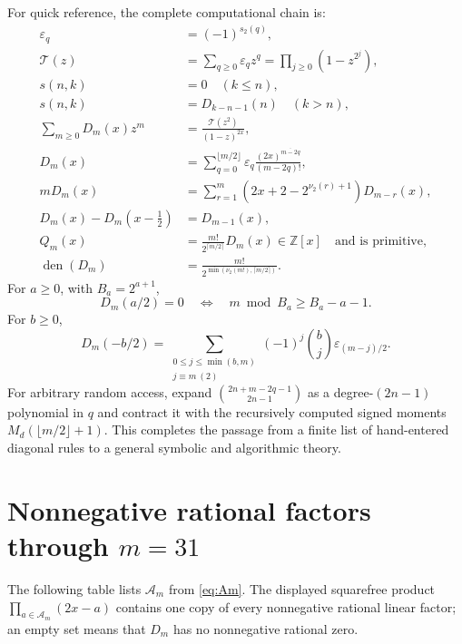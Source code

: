 \documentclass[11pt,oneside]{article}
\theoremstyle{definition}
\theoremstyle{remark}
\newcommand{\Z}{\mathbb Z}
\newcommand{\eps}{\varepsilon}
\newcommand{\Diag}{D}
\newcommand{\TM}{\mathcal T}
\newcommand{\vtwo}{\nu_{2}}
\newcommand{\bitsum}{s_{2}}
\newcommand{\rising}[2]{#1^{\overline{#2}}}
\begin{document}
For quick reference, the complete computational chain is:
\begin{align*}
 \eps_q&=(-1)^{\bitsum(q)},\\
 \TM(z)&=\sum_{q\ge0}\eps_qz^q
          =\prod_{j\ge0}(1-z^{2^j}),\\
 s(n,k)&=0\quad(k\le n),\\
 s(n,k)&=\Diag_{k-n-1}(n)\quad(k>n),\\
 \sum_{m\ge0}\Diag_m(x)z^m
 &=\frac{\TM(z^2)}{(1-z)^{2x}},\\
 \Diag_m(x)&=\sum_{q=0}^{\lfloor m/2\rfloor}
 \eps_q\frac{\rising{(2x)}{m-2q}}{(m-2q)!},\\
 m\Diag_m(x)
 &=\sum_{r=1}^{m}
   \left(2x+2-2^{\vtwo(r)+1}\right)\Diag_{m-r}(x),\\
 \Diag_m(x)-\Diag_m(x-\tfrac12)&=\Diag_{m-1}(x),\\
 Q_m(x)&=\frac{m!}{2^{\lceil m/2\rceil}}\Diag_m(x)\in\Z[x]
 \quad\text{and is primitive},\\
 \operatorname{den}(\Diag_m)&=
 \frac{m!}{2^{\min(\vtwo(m!),\lceil m/2\rceil)}}.
\end{align*}
For $a\ge0$, with $B_a=2^{a+1}$,
\[
 \Diag_m(a/2)=0
 \quad\Longleftrightarrow\quad
 m\bmod B_a\ge B_a-a-1.
\]
For $b\ge0$,
\[
 \Diag_m(-b/2)=
 \sum_{\substack{0\le j\le\min(b,m)\\j\equiv m\ (2)}}
 (-1)^j\binom bj\eps_{(m-j)/2}.
\]
For arbitrary random access, expand
$\binom{2n+m-2q-1}{2n-1}$ as a degree-$(2n-1)$ polynomial in $q$ and contract
it with the recursively computed signed moments $M_d(\lfloor m/2\rfloor+1)$.
This completes the passage from a finite list of hand-entered diagonal rules
to a general symbolic and algorithmic theory.

\appendix

\section{Nonnegative rational factors through \texorpdfstring{$m=31$}{m=31}}
\label{app:factor-table}

The following table lists $\mathcal A_m$ from \eqref{eq:Am}.  The displayed
squarefree product $\prod_{a\in\mathcal A_m}(2x-a)$ contains one copy of every
nonnegative rational linear factor; an empty set means that $\Diag_m$ has no
nonnegative rational zero.
\end{document}
